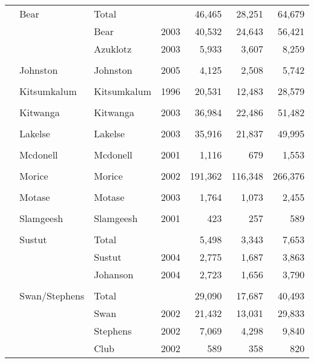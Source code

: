 \documentclass[french,11pt]{book}
\begin{document}
\begin{longtable}[t]{lllrrrr}
\cmidrule(l){2-7}\\  & Bear & Total &  & 46,465 & 28,251 & 64,679\\  &  & Bear & 2003 & 40,532 & 24,643 & 56,421\\  &  & Azuklotz & 2003 & 5,933 & 3,607 & 8,259\\
\cmidrule(l){2-7}\\  & Johnston & Johnston & 2005 & 4,125 & 2,508 & 5,742\\
\cmidrule(l){2-7}\\  & Kitsumkalum & Kitsumkalum & 1996 & 20,531 & 12,483 & 28,579\\
\cmidrule(l){2-7}\\  & Kitwanga & Kitwanga & 2003 & 36,984 & 22,486 & 51,482\\
\cmidrule(l){2-7}\\  & Lakelse & Lakelse & 2003 & 35,916 & 21,837 & 49,995\\
\cmidrule(l){2-7}\\  & Mcdonell & Mcdonell & 2001 & 1,116 & 679 & 1,553\\
\cmidrule(l){2-7}\\  & Morice & Morice & 2002 & 191,362 & 116,348 & 266,376\\
\cmidrule(l){2-7}\\  & Motase & Motase & 2003 & 1,764 & 1,073 & 2,455\\
\cmidrule(l){2-7}\\  & Slamgeesh & Slamgeesh & 2001 & 423 & 257 & 589\\
\cmidrule(l){2-7}\\  & Sustut & Total &  & 5,498 & 3,343 & 7,653\\  &  & Sustut & 2004 & 2,775 & 1,687 & 3,863\\  &  & Johanson & 2004 & 2,723 & 1,656 & 3,790\\
\cmidrule(l){2-7}\\  & Swan/Stephens & Total &  & 29,090 & 17,687 & 40,493\\  &  & Swan & 2002 & 21,432 & 13,031 & 29,833\\  &  & Stephens & 2002 & 7,069 & 4,298 & 9,840\\  &  & Club & 2002 & 589 & 358 & 820\\* \end{longtable}

\endgroup{} \endgroup{}

\clearpage
\end{document}

